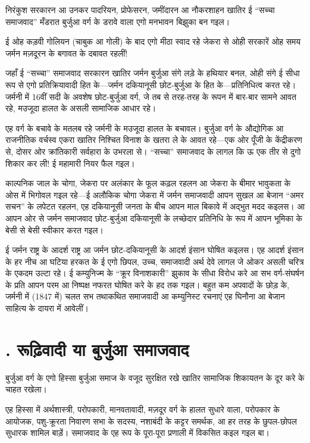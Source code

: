 \documentclass[12pt,a4paper,oneside]{book}
\begin{document}
निरंकुश सरकारन आ उनकर पादरियन, प्रोफेसरन, जमींदारन आ नौकरशाहन खातिर ई “सच्चा समाजवाद” मँडरात बुर्जुआ वर्ग के डरावे वाला एगो मनभावन बिझुका बन गइल।

ई ओह कड़वी गोलियन (चाबुक आ गोली) के बाद एगो मीठा स्वाद रहे जेकरा से ओही सरकारें ओह समय जर्मन मज़दूरन के बगावत के दबावत रहलीं!

जहाँ ई “सच्चा” समाजवाद सरकारन खातिर जर्मन बुर्जुआ संगे लड़े के हथियार बनल, ओही संगे ई सीधा रूप से एगो प्रतिक्रियावादी हित के—जर्मन दकियानूसी छोट-बुर्जुआ के हित के—प्रतिनिधित्व करत रहे। जर्मनी में 16वीं सदी के अवशेष छोट-बुर्जुआ वर्ग, जे तब से तरह-तरह के रूपन में बार-बार सामने आवत रहे, मउजूदा हालत के असली सामाजिक आधार रहे।

एह वर्ग के बचावे के मतलब रहे जर्मनी के मउजूदा हालत के बचावल। बुर्जुआ वर्ग के औद्योगिक आ राजनीतिक वर्चस्व एकरा खातिर निश्चित विनाश के खतरा ले के आवत रहे—एक ओर पूँजी के केंद्रीकरण से, दोसर ओर क्रांतिकारी सर्वहारा के उभरला से। “सच्चा” समाजवाद के लागल कि ऊ एक तीर से दुगो शिकार कर ली! ई महामारी नियर फैल गइल।

काल्पनिक जाल के चोगा, जेकरा पर अलंकार के फूल कढ़ल रहलन आ जेकरा के बीमार भावुकता के ओस में भिगोवल गइल रहे—ई अलौकिक चोगा जेकरा में जर्मन समाजवादी आपन सुखल आ बेजान “अमर सचन” के लपेटत रहलन, एह दकियानूसी जनता के बीच आपन माल बिकावे में अद्भुत मदद कइलस। आ आपन ओर से जर्मन समाजवाद छोट-बुर्जुआ दकियानूसी के लच्छेदार प्रतिनिधि के रूप में आपन भूमिका के बेसी से बेसी स्वीकार करत गइल।

ई जर्मन राष्ट्र के आदर्श राष्ट्र आ जर्मन छोट-दकियानूसी के आदर्श इंसान घोषित कइलस। एह आदर्श इंसान के हर नीच आ घटिया हरकत के ई एगो छिपल, उच्च, समाजवादी अर्थ देवे लागल जे ओकर असली चरित्र के एकदम उल्टा रहे। ई कम्युनिज्म के “क्रूर विनाशकारी” झुकाव के सीधा विरोध करे आ सभ वर्ग-संघर्षन के प्रति आपन परम आ निष्पक्ष नफरत घोषित करे के हद तक गइल। बहुत कम अपवादों के छोड़ के, जर्मनी में (1847 में) चलत सभ तथाकथित समाजवादी आ कम्युनिस्ट रचनाएं एह घिनौना आ बेजान साहित्य के दायरा में आवेलीं।


\section*{{}. रूढ़िवादी या बुर्जुआ समाजवाद}
बुर्जुआ वर्ग के एगो हिस्सा बुर्जुआ समाज के वजूद सुरक्षित रखे खातिर सामाजिक शिकायतन के दूर करे के चाहत रखेला।

एह हिस्सा में अर्थशास्त्री, परोपकारी, मानवतावादी, मज़दूर वर्ग के हालत सुधारे वाला, परोपकार के आयोजक, पशु-क्रूरता निवारण सभा के सदस्य, नशाबंदी के कट्टर समर्थक, आ हर तरह के छुपल-छोपल सुधारक शामिल बाड़ें। समाजवाद के एह रूप के पूरा-पूरा प्रणाली में विकसित कइल गइल बा।
\end{document}
